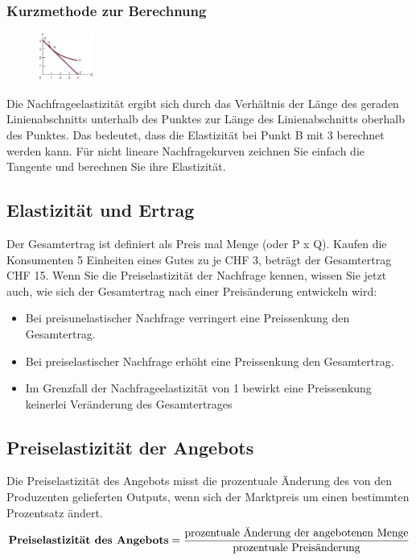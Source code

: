 \documentclass[10pt]{scrartcl}
\begin{document}
\subsubsection{Kurzmethode zur Berechnung}
\begin{figure}
\vspace{-20pt}
  \begin{center}
    \includegraphics[width=0.16\textwidth]{img/kurzmethode_elas.jpg}
  \end{center}
  \vspace{-20pt}
\end{figure}
Die Nachfrageelastizität ergibt sich durch das Verhältnis der Länge des geraden Linienabschnitts unterhalb des Punktes zur Länge des Linienabschnitts oberhalb des Punktes. Das bedeutet, dass die Elastizität bei Punkt B mit 3 berechnet werden kann. Für nicht lineare Nachfragekurven zeichnen Sie einfach die Tangente und berechnen Sie ihre Elastizität.\\

\subsection{Elastizität und Ertrag}
Der Gesamtertrag ist definiert als Preis mal Menge (oder P x Q). Kaufen die Konsumenten 5 Einheiten eines Gutes zu je CHF 3, beträgt der Gesamtertrag CHF 15. Wenn Sie die Preiselastizität der Nachfrage kennen, wissen Sie jetzt auch, wie sich der Gesamtertrag nach einer Preisänderung entwickeln wird:
\begin{itemize}
\item Bei preisunelastischer Nachfrage verringert eine Preissenkung den Gesamtertrag.
\item Bei preiselastischer Nachfrage erhöht eine Preissenkung den Gesamtertrag.
\item Im Grenzfall der Nachfrageelastizität von 1 bewirkt eine Preissenkung keinerlei Veränderung des Gesamtertrages
\end{itemize}
\subsection{Preiselastizität der Angebots}
Die Preiselastizität des Angebots misst die prozentuale Änderung des von den Produzenten gelieferten Outputs, wenn sich der Marktpreis um einen bestimmten Prozentsatz ändert.
\begin{equation}
\text{{\bf Preiselastizität des Angebots}} = \frac{\text{prozentuale Änderung der angebotenen Menge}}{\text{prozentuale Preisänderung}} \nonumber
\end{equation}\\
\end{document}
